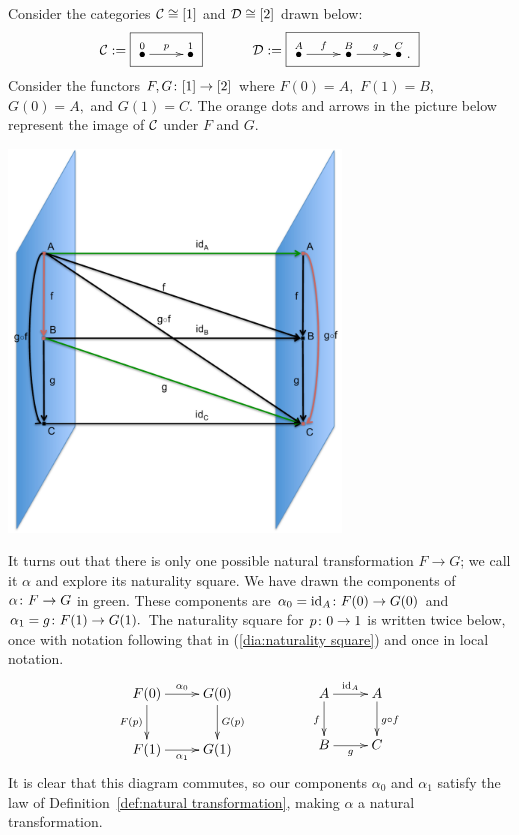 \documentclass[CT4S-EN-RU]{subfiles}
\begin{document}
\begin{exampleENG}
Consider the categories $\mathcal{C}\cong[1]$ and $\mathcal{D}\cong[2]$ drawn below:
$$\mcC:=\fbox{\xymatrix{\LMO{0}\ar[r]^p&\LMO{1}
}}
\hspace{.5in}
\mcD:=\fbox{\xymatrix{\LMO{A}\ar[r]^f&\LMO{B}\ar[r]^g&\LMO{C}.
}}
$$
Consider the functors $F,G\colon[1]\rightarrow[2]$ where $F(0)=A,$ $F(1)=B,$ $G(0)=A,$ and $G(1)=C.$ The orange dots and arrows in the picture below represent the image of $\mathcal{C}$ under $F$ and $G.$

\begin{center}
\includegraphics[height=4in]{natTrans}
\end{center}

It turns out that there is only one possible natural transformation $F\to G$; we call it $\alpha$ and explore its naturality square. We have drawn the components of $\alpha\colon F\rightarrow G$ in green. These components are $\alpha_0=\textnormal{id}_A\colon F(0)\rightarrow G(0)$ and $\alpha_1=g\colon F(1)\rightarrow G(1).$ The naturality square for $p\colon 0\rightarrow 1$ is written twice below, once with notation following that in (\ref{dia:naturality square}) and once in local notation.
$$
\xymatrix{
F(0)\ar[r]^{\alpha_0}\ar[d]_{F(p)}&G(0)\ar[d]^{G(p)}\\
F(1)\ar[r]_{\alpha_1}&G(1)}
\hspace{.6in}
\xymatrix{
A\ar[r]^{\id_A}\ar[d]_{f}&A\ar[d]^{g\circ f}\\
B\ar[r]_{g}&C
}
$$
It is clear that this diagram commutes, so our components $\alpha_0$ and $\alpha_1$ satisfy the law of Definition~\ref{def:natural transformation}, making $\alpha$ a natural transformation.
\end{exampleENG}
\end{document}
